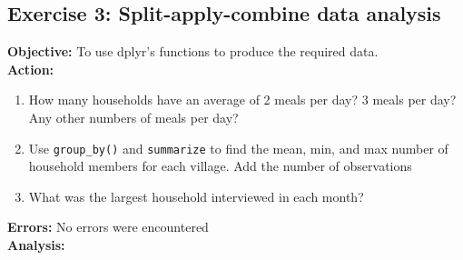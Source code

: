 \documentclass{article}
\begin{document}
\subsection{Exercise 3: Split-apply-combine data analysis}
\textbf{Objective:} To use dplyr's functions to produce the required data.\\
\textbf{Action:}
\begin{enumerate}
    \item How many households have an average of 2 meals per day? 3 meals per day? Any other numbers of meals per day?
    \item Use \texttt{group\_by()} and \texttt{summarize} to find the mean, min, and max number of household members for each village. Add the number of observations
    \item What was the largest household interviewed in each month?
\end{enumerate}
\textbf{Errors:} No errors were encountered\\
\textbf{Analysis:}
\end{document}
